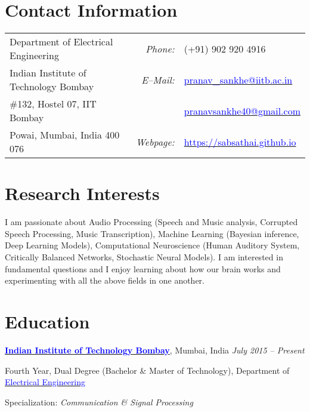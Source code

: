\documentclass[margin,line]{res}
\newenvironment{list1}{
  \begin{list}{\ding{113}}{%
      \setlength{\itemsep}{0in}
      \setlength{\parsep}{0in} \setlength{\parskip}{0in}
      \setlength{\topsep}{0in} \setlength{\partopsep}{0in} 
      \setlength{\leftmargin}{0.17in}}}{\end{list}}
\begin{document}

\begin{resume}
\section{\sc Contact Information}
\vspace{.05in}
\begin{tabular}{@{}p{2.9in}p{.5in}p{3in}}
Department of Electrical Engineering & \multicolumn{1}{r}{\it Phone:}  &(+91) 902 920 4916 \\            
Indian Institute of Technology Bombay &\multicolumn{1}{r}{\it E--Mail:}& \href{mailto:pranav_sankhe@iitb.ac.in}{\textcolor{blue}{pranav\_sankhe@iitb.ac.in}} \\ 
\#132, Hostel 07, IIT Bombay & & \href{mailto:pranavsankhe40@gmail.com}{\textcolor{blue}{pranavsankhe40@gmail.com}} \\ 
Powai, Mumbai, India 400 076 & \multicolumn{1}{r}{\it Webpage:} &\href{https://sabsathai.github.io}{\textcolor{blue}{https://sabsathai.github.io}} \\     
\end{tabular}

\section{\sc Research Interests}
\lettrine[lines=2]{I}{} am passionate about Audio Processing (Speech and Music analysis, Corrupted Speech Processing, Music Transcription), Machine Learning (Bayesian inference, Deep Learning Models), Computational Neuroscience (Human Auditory System, Critically Balanced Networks, Stochastic Neural Models). I am interested in fundamental questions and I enjoy learning about how our brain works and experimenting with all the above fields in one another.

\section{\sc Education}
{\bf \href{http://www.iitb.ac.in/}{\textcolor{blue}{Indian Institute of Technology Bombay}}}, Mumbai, India \hfill {\it July 2015 -- Present} \\
\vspace*{-.1in}
\begin{list1}
\item[] Fourth Year, Dual Degree (Bachelor \& Master of Technology), Department of \href{http://www.ee.iitb.ac.in/}{\textcolor{blue}{Electrical Engineering}}
\item[] Specialization: {\em Communication \& Signal Processing}
\end{list1}


\end{resume}
\end{document}
